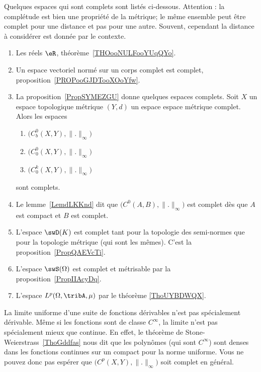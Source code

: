 Quelques espaces qui sont complets sont listés ci-dessous. Attention : la complétude est bien une propriété de la métrique; le même ensemble peut être complet pour une distance et pas pour une autre. Souvent, cependant la distance à considérer est donnée par  le contexte.
\begin{multicols}{2}
    \begin{enumerate}
        \item
            Les réels \( \eR\), théorème~\ref{THOooNULFooYUqQYo}.
        \item
            Un espace vectoriel normé sur un corps complet est complet, proposition~\ref{PROPooGJDTooXOoYfw}.
        \item
            La proposition~\ref{PropSYMEZGU} donne quelques espaces complets. Soit \( X\) un espace topologique métrique \( (Y,d)\) un espace espace métrique complet. Alors les espaces
    \begin{enumerate}
        \item
            \( \big( C^0_b(X,Y),\| . \|_{\infty} \big)\)
        \item
            \( \big( C^0_0(X,Y),\| . \|_{\infty} \big)\)
        \item
            \( \big( C^k_0(X,Y),\| . \|_{\infty} \big)\)
    \end{enumerate}
    sont complets.
\item
    Le lemme~\ref{LemdLKKnd} dit que \( \big( C^0(A,B),\| . \|_{\infty}\big)\) est complet dès que \( A\) est compact et \( B\) est complet.

\item
    L'espace \( \swD(K)\) est complet tant pour la topologie des semi-normes que pour la topologie métrique (qui sont les mêmes). C'est la proposition~\ref{PropQAEVcTi}.
\item
    L'espace \( \swS(\Omega)\) est complet et métrisable par la proposition~\ref{PropIIAcyDq}.
\item
    L'espace \( L^p(\Omega,\tribA,\mu)\) par le théorème \ref{ThoUYBDWQX}.
    \end{enumerate}
\end{multicols}

    La limite uniforme d'une suite de fonctions dérivables n'est pas spécialement dérivable. Même si les fonctions sont de classe \(  C^{\infty}\), la limite n'est pas spécialement mieux que continue. En effet, le théorème de Stone-Weierstrass~\ref{ThoGddfas} nous dit que les polynômes (qui sont \(  C^{\infty}\)) sont denses dans les fonctions continues sur un compact pour la norme uniforme. Vous ne pouvez donc pas espérer que \( \big( C^p(X,Y),\| . \|_{\infty} \big)\) soit complet en général.



